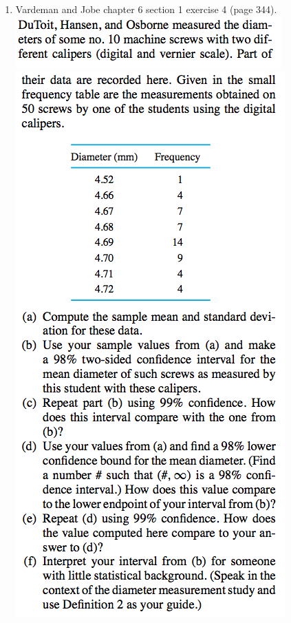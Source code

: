 \documentclass{article}\usepackage{graphicx, color}
\numberwithin{equation}{section}
\begin{document}
\begin{flushleft}
\begin{enumerate}[1. ]
\item Vardeman and Jobe chapter 6 section 1 exercise 4 (page 344).
 \includegraphics{../../fig/h8p4-1.png}
 \includegraphics{../../fig/h8p4-2.png}

\end{enumerate}
\end{flushleft}
\end{document}
